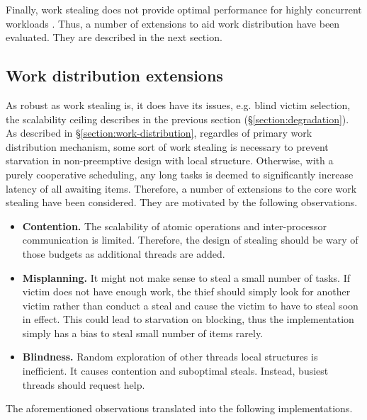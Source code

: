 \documentclass[12pt,a4paper,twoside]{report}
\begin{document}
Finally, work stealing does not provide optimal performance for highly concurrent workloads \cite{section:benchmark-general-case}. Thus, a number of extensions to aid work distribution have been evaluated. They are described in the next section.

\subsection{Work distribution extensions}
\label{section:work-distribution-extensions}

As robust as work stealing is, it does have its issues, e.g. blind victim selection, the scalability ceiling describes in the previous section (\S\ref{section:degradation}). 
As described in \S\ref{section:work-distribution}, regardles of primary work distribution mechanism, some sort of work stealing is necessary to prevent starvation in non-preemptive design with local structure. Otherwise, with a purely cooperative scheduling, any long tasks is deemed to significantly increase latency of all awaiting items. Therefore, a number of extensions to the core work stealing have been considered. They are motivated by the following observations.

\begin{itemize}
    \item \textbf{Contention.} The scalability of atomic operations and inter-processor communication is limited. Therefore, the design of stealing should be wary of those budgets as additional threads are added. 
    \item \textbf{Misplanning.} It might not make sense to steal a small number of tasks. If victim does not have enough work, the thief should simply look for another victim rather than conduct a steal and cause the victim to have to steal soon in effect. This could lead to starvation on blocking, thus the implementation simply has a bias to steal small number of items rarely. 
    \item \textbf{Blindness.} Random exploration of other threads local structures is inefficient. It causes contention and suboptimal steals. Instead, busiest threads should request help. 
\end{itemize}

The aforementioned observations translated into the following implementations. 
\end{document}
